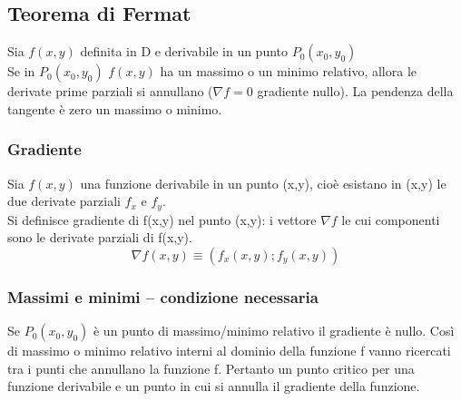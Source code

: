 \subsection{Teorema di Fermat}
\begin{teorema}
  Sia $f(x,y)$ definita in D e derivabile in un punto $P_0 (x_0,y_0)$\\
  Se in $P_0(x_0,y_0)$ $f(x,y)$ ha un massimo o un minimo relativo, allora le derivate prime
  parziali si annullano ($\nabla f=0$ gradiente nullo). La pendenza della tangente è zero un
  massimo o minimo.
\end{teorema}
\subsubsection{Gradiente}
Sia $f(x,y)$ una funzione derivabile in un punto (x,y), cioè esistano in (x,y) le due derivate
parziali $f_x$ e $f_y$.\\
Si definisce {\color{red} gradiente} di f(x,y) nel punto (x,y): i vettore $\nabla f$ le cui componenti sono le derivate parziali di f(x,y).
\begin{equation}
  \nabla f(x,y) \equiv (f_x(x,y); f_y(x,y))
\end{equation}
\subsubsection{Massimi e minimi -- condizione necessaria}
\begin{defi}
  Se $P_0(x_0,y_0)$ è un punto di massimo/minimo relativo il gradiente è nullo. Così di massimo
  o minimo relativo interni al dominio della funzione f vanno ricercati tra i punti che annullano
  la funzione f. Pertanto un punto critico per una funzione derivabile e un punto in cui si
  annulla il gradiente della funzione.
\end{defi}
